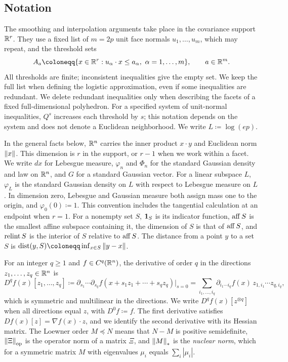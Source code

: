 \subsection{Notation}\label{tb:sec:notation}

The smoothing and interpolation arguments take place in the covariance
support \(\mathbb R^r\). They use a fixed list of \(m=2p\) unit face normals
\(u_1,\ldots,u_m\), which may repeat, and the threshold sets
\[
 A_a\coloneqq\{x\in\R^r:u_\alpha\cdot x\le a_\alpha,
                          \ \alpha=1,\ldots,m\},\qquad a\in\R^m.
\]
All thresholds are finite; inconsistent inequalities give the empty set.
We keep the full list when defining the logistic approximation, even if
some inequalities are redundant. We delete redundant inequalities only
when describing the facets of a fixed full-dimensional polyhedron.
For a specified system of unit-normal inequalities, \(Q^s\) increases
each threshold by \(s\); this notation depends on the system and does
not denote a Euclidean neighborhood. We write \(L\coloneqq\log(ep)\).

In the general facts below, \(\mathbb R^n\) carries the inner product
\(x\cdot y\) and Euclidean norm \(\left\lVert x\right\rVert\). This dimension is \(r\)
in the support, or \(r-1\) when we work within a facet. We write \(dx\) for Lebesgue measure, \(\varphi_n\) and
\(\Phi_n\) for the standard Gaussian density and law on \(\mathbb R^n\), and \(G\)
for a standard Gaussian vector. For a linear subspace \(L\), \(\varphi_L\)
is the standard Gaussian density on \(L\) with respect to Lebesgue measure
on \(L\). In dimension zero, Lebesgue and Gaussian measure both assign
mass one to the origin, and \(\varphi_0(0)\coloneqq1\). This convention
includes the tangential calculation at an endpoint when \(r=1\).
For a nonempty set \(S\), \(\mathbf 1_S\) is its indicator function, \(\operatorname{aff} S\)
is the smallest affine subspace containing it, the dimension of \(S\) is
that of \(\operatorname{aff} S\), and \(\operatorname{relint} S\) is the interior of \(S\) relative to
\(\operatorname{aff} S\). The distance from a point \(y\) to a set \(S\) is
\(\dist(y,S)\coloneqq \inf_{x\in S}\norm{y-x}\).

For an integer \(q\ge1\) and \(f\in C^q(\mathbb R^n)\), the derivative of order \(q\) in the directions
\(z_1,\ldots,z_q\in\mathbb R^n\) is
\[
 D^qf(x)[z_1,\ldots,z_q]
 \coloneqq \partial_{s_1}\cdots\partial_{s_q}f(x+s_1z_1+\cdots+s_qz_q)\Big|_{s=0}
 =\sum_{i_1,\ldots,i_q}\partial_{i_1\cdots i_q}f(x)\,
   z_{1,i_1}\cdots z_{q,i_q},
\]
which is symmetric and multilinear in the directions. We write
\(D^qf(x)[z^{\otimes q}]\) when all directions equal \(z\), with
\(D^0f\coloneqq f\). The first derivative satisfies
\(Df(x)[z]=\nabla f(x)\cdot z\), and we identify the second derivative
with its Hessian matrix. The Loewner order \(M\preceq N\) means that
\(N-M\) is positive semidefinite, \(\left\lVert\Xi\right\rVert_{\mathrm{op}}\) is the operator norm
of a matrix \(\Xi\), and \(\left\lVert M\right\rVert_*\) is the \emph{nuclear norm}, which for
a symmetric matrix \(M\) with eigenvalues \(\mu_i\) equals \(\sum_i|\mu_i|\).

